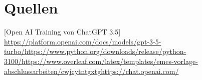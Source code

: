 \documentclass[class=scrbook, crop=false]{standalone}
\begin{document}
\chapter*{Quellen}
\label{ch:quellen}
{

[Open AI Training von ChatGPT 3.5] \url{https://platform.openai.com/docs/models/gpt-3-5-turbo/} \url{https://www.python.org/downloads/release/python-3100/} \url{https://www.overleaf.com/latex/templates/emes-vorlage-abschlussarbeiten/cwjcytntgxtg} \url{https://chat.openai.com/}

}
\end{document}
